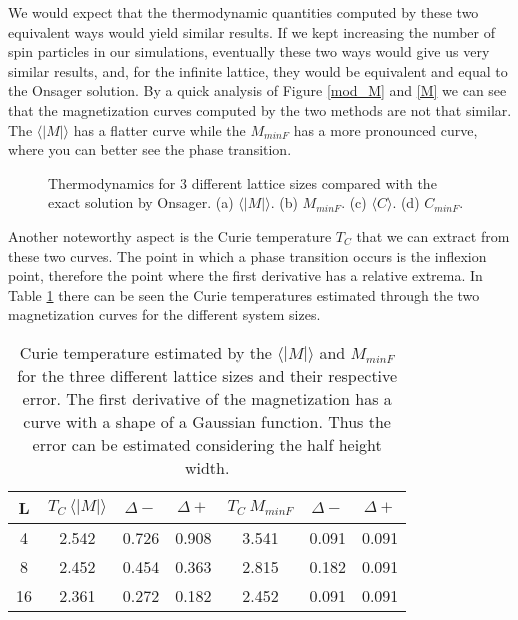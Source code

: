	We would expect that the thermodynamic quantities computed by these two equivalent ways would yield similar results. If we kept increasing the number of spin particles in our simulations, eventually these two ways would give us very similar results, and, for the infinite lattice, they would be equivalent and equal to the Onsager solution. By a quick analysis of Figure \ref{mod_M} and \ref{M} we can see that the magnetization curves computed by the two methods are not that similar. The $\langle |M| \rangle$ has a flatter curve while the $M_{minF}$ has a more pronounced curve, where you can better see the phase transition. 
\begin{figure}[h]
	\centering
	
	\caption{Thermodynamics for 3 different lattice sizes compared with the exact solution by Onsager. (a) $\langle |M| \rangle$. (b) $M_{minF}$. (c) $\langle C \rangle$. (d) $C_{minF}$.}
	\label{thermo_4}
\end{figure}
	Another noteworthy aspect is the Curie temperature $T_C$ that we can extract from these two curves. The point in which a phase transition occurs is the inflexion point, therefore the point where the first derivative has a relative extrema. In Table \ref{TC_table} there can be seen the Curie temperatures estimated through the two magnetization curves for the different system sizes. 

\begin{table}[h]
\centering
\caption{Curie temperature estimated by the $\langle |M| \rangle$ and $M_{minF}$ for the three different lattice sizes and their respective error. The first derivative of the magnetization has a curve with a shape of a Gaussian function. Thus the error can be estimated considering the half height width.}
\begin{tabular}{c|ccc|ccc}
L  & $T_C\ \langle |M| \rangle$ & $\Delta -$ & $\Delta +$ & $T_C\ M_{minF}$ & $\Delta -$ & $\Delta +$ \\ \hline
4  & 2.542                                                 & 0.726                  & 0.908         & 3.541           & 0.091                  & 0.091                \\
8  & 2.452                                                 & 0.454                   & 0.363                  & 2.815           & 0.182         & 0.091                  \\
16 & 2.361                                                 & 0.272                  & 0.182                  & 2.452           & 0.091                  & 0.091                 
\end{tabular}
\label{TC_table}
\end{table}


